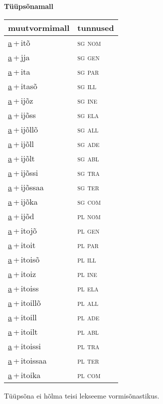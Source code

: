 
\vspace{1.8em}
\begin{minipage}{\textwidth}
\textbf{Tüüpsõnamall \,}\\

\begin{sideways}
\begin{tabular}{l l}
muutvormimall & tunnused \\
\hline
\underline{a}\,+\,itõ & \textsc{ sg nom } \\
\underline{a}\,+\,jja & \textsc{ sg gen } \\
\underline{a}\,+\,ita & \textsc{ sg par } \\
\underline{a}\,+\,itasõ & \textsc{ sg ill } \\
\underline{a}\,+\,ijõz & \textsc{ sg ine } \\
\underline{a}\,+\,ijõss & \textsc{ sg ela } \\
\underline{a}\,+\,ijõllõ & \textsc{ sg all } \\
\underline{a}\,+\,ijõll & \textsc{ sg ade } \\
\underline{a}\,+\,ijõlt & \textsc{ sg abl } \\
\underline{a}\,+\,ijõssi & \textsc{ sg tra } \\
\underline{a}\,+\,ijõssaa & \textsc{ sg ter } \\
\underline{a}\,+\,ijõka & \textsc{ sg com } \\
\underline{a}\,+\,ijõd & \textsc{ pl nom } \\
\underline{a}\,+\,itojõ & \textsc{ pl gen } \\
\underline{a}\,+\,itoit & \textsc{ pl par } \\
\underline{a}\,+\,itoisõ & \textsc{ pl ill } \\
\underline{a}\,+\,itoiz & \textsc{ pl ine } \\
\underline{a}\,+\,itoiss & \textsc{ pl ela } \\
\underline{a}\,+\,itoillõ & \textsc{ pl all } \\
\underline{a}\,+\,itoill & \textsc{ pl ade } \\
\underline{a}\,+\,itoilt & \textsc{ pl abl } \\
\underline{a}\,+\,itoissi & \textsc{ pl tra } \\
\underline{a}\,+\,itoissaa & \textsc{ pl ter } \\
\underline{a}\,+\,itoika & \textsc{ pl com } \\
\end{tabular}
\end{sideways}
\label{tab:tüüpsõnamall-aitõ}

\end{minipage}

 
\vspace{1em}
\noindent Tüüpsõna ei hõlma teisi lekseeme vormi\-sõnastikus.
